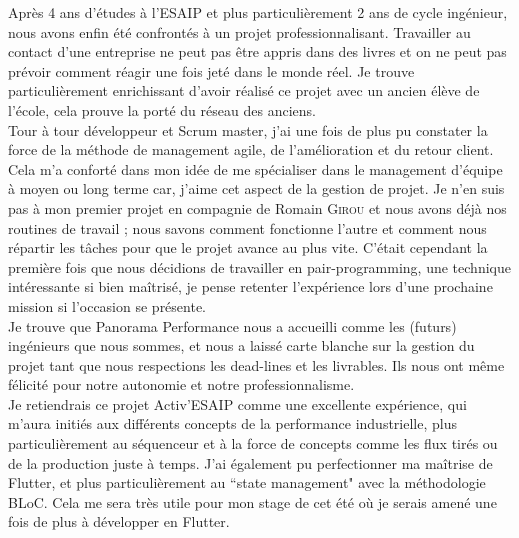 Après 4 ans d'études à l'ESAIP et plus particulièrement 2 ans de cycle ingénieur, nous avons enfin été confrontés à un projet professionnalisant. Travailler au contact d'une entreprise ne peut pas être appris dans des livres et on ne peut pas prévoir comment réagir une fois jeté dans le monde réel. Je trouve particulièrement enrichissant d'avoir réalisé ce projet avec un ancien élève de l'école, cela prouve la porté du réseau des anciens.
\hfill \\

Tour à tour développeur et Scrum master, j'ai une fois de plus pu constater la force de la méthode de management agile, de l'amélioration et du retour client. Cela m'a conforté dans mon idée de me spécialiser dans le management d'équipe à moyen ou long terme car, j'aime cet aspect de la gestion de projet. Je n'en suis pas à mon premier projet en compagnie de Romain \textsc{Girou} et nous avons déjà nos routines de travail ; nous savons comment fonctionne l'autre et comment nous répartir les tâches pour que le projet avance au plus vite. C'était cependant la première fois que nous décidions de travailler en pair-programming, une technique intéressante si bien maîtrisé, je pense retenter l'expérience lors d'une prochaine mission si l'occasion se présente.
\hfill \\

Je trouve que Panorama Performance nous a accueilli comme les (futurs) ingénieurs que nous sommes, et nous a laissé carte blanche sur la gestion du projet tant que nous respections les dead-lines et les livrables. Ils nous ont même félicité pour notre autonomie et notre professionnalisme.
\hfill \\

Je retiendrais ce projet Activ'ESAIP comme une excellente expérience, qui m'aura initiés aux différents concepts de la performance industrielle, plus particulièrement au séquenceur et à la force de concepts comme les flux tirés ou de la production juste à temps. J'ai également pu perfectionner ma maîtrise de Flutter, et plus particulièrement au “state management" avec la méthodologie BLoC. Cela me sera très utile pour mon stage de cet été où je serais amené une fois de plus à développer en Flutter.
